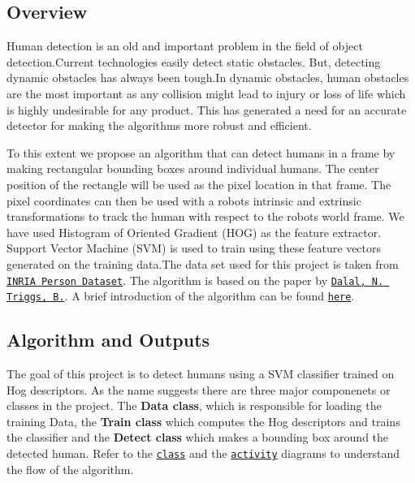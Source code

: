 \href{https://travis-ci.org/anirudhtopiwala/Human_Detector}{\tt } \href{https://coveralls.io/github/anirudhtopiwala/Human_Detector?branch=master}{\tt } \subsection*{\href{https://opensource.org/licenses/MIT}{\tt } }

\subsection*{Overview}

Human detection is an old and important problem in the field of object detection.\+Current technologies easily detect static obstacles. But, detecting dynamic obstacles has always been tough.\+In dynamic obstacles, human obstacles are the most important as any collision might lead to injury or loss of life which is highly undesirable for any product. This has generated a need for an accurate detector for making the algorithms more robust and efficient.

To this extent we propose an algorithm that can detect humans in a frame by making rectangular bounding boxes around individual humans. The center position of the rectangle will be used as the pixel location in that frame. The pixel coordinates can then be used with a robots intrinsic and extrinsic transformations to track the human with respect to the robot\textquotesingle{}s world frame. We have used Histogram of Oriented Gradient (H\+OG) as the feature extractor. Support Vector Machine (S\+VM) is used to train using these feature vectors generated on the training data.\+The data set used for this project is taken from \href{http://pascal.inrialpes.fr/data/human/}{\tt I\+N\+R\+IA Person Dataset}. The algorithm is based on the paper by \href{https://ieeexplore.ieee.org/document/1467360}{\tt Dalal, N. Triggs, B.}. A brief introduction of the algorithm can be found \href{https://www.learnopencv.com/histogram-of-oriented-gradients/}{\tt here}.

\subsection*{Algorithm and Outputs}

The goal of this project is to detect humans using a S\+VM classifier trained on Hog descriptors. As the name suggests there are three major componenets or classes in the project. The {\bfseries Data class}, which is responsible for loading the training Data, the {\bfseries Train class} which computes the Hog descriptors and trains the classifier and the {\bfseries Detect class} which makes a bounding box around the detected human. Refer to the \href{https://github.com/anirudhtopiwala/Human_Detector/blob/master/UML/revised/UML_Class.pdf}{\tt class} and the \href{https://github.com/anirudhtopiwala/Human_Detector/blob/master/UML/initial/UML_Activity.pdf}{\tt activity} diagrams to understand the flow of the algorithm.


